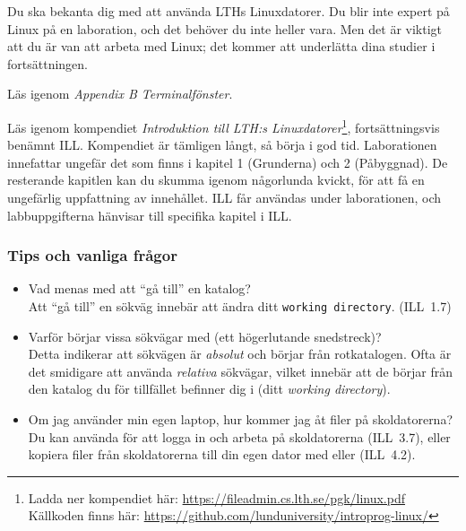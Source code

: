 
\Lab{\LabWeekONEdod}
%
\begin{Goals}
\item Du ska bekanta dig med att använda LTHs Linuxdatorer. Du blir inte expert på Linux på en laboration, och det behöver du inte heller vara. Men det är viktigt att du är van att arbeta med Linux; det kommer att underlätta dina studier i fortsättningen.

\end{Goals}

\begin{Preparations}
\item Läs igenom \emph{Appendix B Terminalfönster}.
\item Läs igenom kompendiet  \emph{Introduktion till LTH:s Linuxdatorer}\footnote{Ladda ner kompendiet här: \url{https://fileadmin.cs.lth.se/pgk/linux.pdf}\\Källkoden finns här: \url{https://github.com/lunduniversity/introprog-linux/}}, fortsättningsvis benämnt ILL. Kompendiet är tämligen långt, så börja i god tid. Laborationen innefattar ungefär det som finns i kapitel 1 (Grunderna) och 2 (Påbyggnad). De resterande kapitlen kan du skumma igenom någorlunda kvickt, för att få en ungefärlig uppfattning av innehållet. ILL får användas under laborationen, och labbuppgifterna hänvisar till specifika kapitel i ILL. 
\end{Preparations}

\subsubsection{Tips och vanliga frågor}
\begin{itemize}[nosep]
    \item Vad menas med att \enquote{gå till} en katalog?\\
          Att \enquote{gå till} en sökväg innebär att ändra ditt \texttt{working directory}. (ILL~1.7)

    \item Varför börjar vissa sökvägar med \code{/} (ett högerlutande snedstreck)? \\
          Detta indikerar att sökvägen är \emph{absolut} och börjar från rotkatalogen. Ofta är det smidigare att använda \emph{relativa} sökvägar, vilket innebär att de börjar från den katalog du för tillfället befinner dig i (ditt \emph{working directory}).

    \item Om jag använder min egen laptop, hur kommer jag åt filer på skoldatorerna?\\
          Du kan använda  för att logga in och arbeta på skoldatorerna (ILL~3.7), eller kopiera filer från skoldatorerna till din egen dator med  eller  (ILL~4.2).
\end{itemize}



